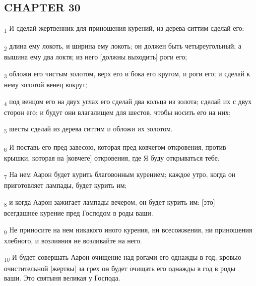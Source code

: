 \subsection{CHAPTER 30}
\begin{tcolorbox}
\textsubscript{1} И сделай жертвенник для приношения курений, из дерева ситтим сделай его:
\end{tcolorbox}
\begin{tcolorbox}
\textsubscript{2} длина ему локоть, и ширина ему локоть; он должен быть четыреугольный; а вышина ему два локтя; из него [должны выходить] роги его;
\end{tcolorbox}
\begin{tcolorbox}
\textsubscript{3} обложи его чистым золотом, верх его и бока его кругом, и роги его; и сделай к нему золотой венец вокруг;
\end{tcolorbox}
\begin{tcolorbox}
\textsubscript{4} под венцом его на двух углах его сделай два кольца из золота; сделай их с двух сторон его; и будут они влагалищем для шестов, чтобы носить его на них;
\end{tcolorbox}
\begin{tcolorbox}
\textsubscript{5} шесты сделай из дерева ситтим и обложи их золотом.
\end{tcolorbox}
\begin{tcolorbox}
\textsubscript{6} И поставь его пред завесою, которая пред ковчегом откровения, против крышки, которая на [ковчеге] откровения, где Я буду открываться тебе.
\end{tcolorbox}
\begin{tcolorbox}
\textsubscript{7} На нем Аарон будет курить благовонным курением; каждое утро, когда он приготовляет лампады, будет курить им;
\end{tcolorbox}
\begin{tcolorbox}
\textsubscript{8} и когда Аарон зажигает лампады вечером, он будет курить им: [это] --всегдашнее курение пред Господом в роды ваши.
\end{tcolorbox}
\begin{tcolorbox}
\textsubscript{9} Не приносите на нем никакого иного курения, ни всесожжения, ни приношения хлебного, и возлияния не возливайте на него.
\end{tcolorbox}
\begin{tcolorbox}
\textsubscript{10} И будет совершать Аарон очищение над рогами его однажды в год; кровью очистительной [жертвы] за грех он будет очищать его однажды в год в роды ваши. Это святыня великая у Господа.
\end{tcolorbox}
